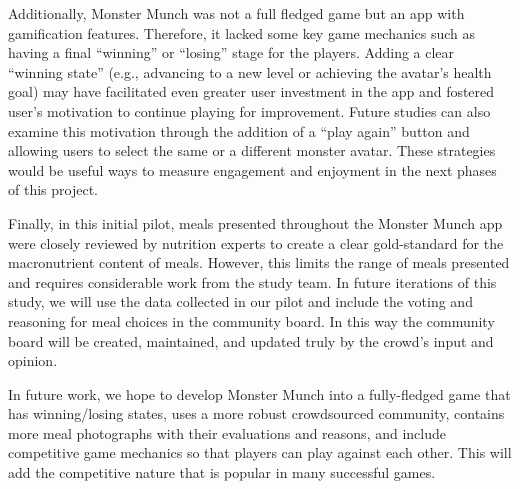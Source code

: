 Additionally, Monster Munch was not a full fledged game but an app with gamification features. Therefore, it lacked some key game mechanics such as having a final ``winning'' or ``losing'' stage for the players. Adding a clear ``winning state'' (e.g., advancing to a new level or achieving the avatar's health goal) may have facilitated even greater user investment in the app and fostered user's motivation to continue playing for improvement. 
Future studies can also examine this motivation through the addition of a ``play again'' button and allowing users to select the same or a different monster avatar. 
These strategies would be useful ways to measure engagement and enjoyment in the next phases of this project.  

Finally, in this initial pilot, meals presented throughout the Monster Munch app were closely reviewed by nutrition experts to create a clear gold-standard for the macronutrient content of meals. 
However, this limits the range of meals presented and requires considerable work from the study team. In future iterations of this study, we will use the data collected in our pilot and include the voting and reasoning for meal choices in the community board. In this way the community board will be created, maintained, and updated truly by the crowd's input and opinion.  

In future work, we hope to develop Monster Munch into a fully-fledged game that has winning/losing states, uses a more robust crowdsourced community, contains more meal photographs with their evaluations and reasons, and include competitive game mechanics so that players can play against each other.  
This will add the competitive nature that is popular in many successful games. 





